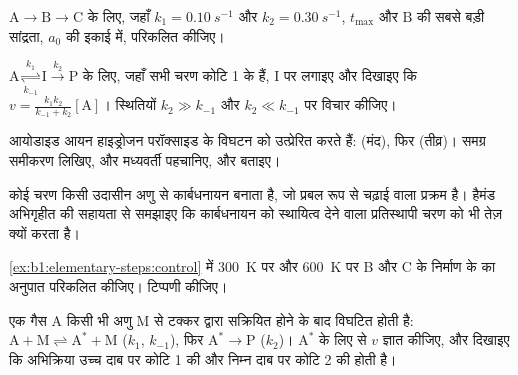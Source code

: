 \begin{exercise}[$\star\star$]\label{exo:b1:elementary-steps:5}
$\mathrm{A} \to \mathrm{B} \to \mathrm{C}$ के लिए, जहाँ $k_1 =
\qty{0.10}{s^{-1}}$ और $k_2 = \qty{0.30}{s^{-1}}$, $t_{\max}$ और
$\mathrm{B}$ की सबसे बड़ी सांद्रता, $a_0$ की इकाई में, परिकलित कीजिए।
\end{exercise}

\begin{exercise}[$\star\star$]\label{exo:b1:elementary-steps:6}
$\mathrm{A} \underset{k_{-1}}{\overset{k_1}{\rightleftharpoons}}
\mathrm{I} \xrightarrow{k_2} \mathrm{P}$ के लिए, जहाँ सभी चरण कोटि 1 के हैं,
$\mathrm{I}$ पर  लगाइए और दिखाइए कि $v =
\frac{k_1k_2}{k_{-1} + k_2}[\mathrm{A}]$। स्थितियों $k_2 \gg
k_{-1}$ और $k_2 \ll k_{-1}$ पर विचार कीजिए।
\end{exercise}

\begin{exercise}[$\star\star$]\label{exo:b1:elementary-steps:7}
आयोडाइड आयन हाइड्रोजन परॉक्साइड के विघटन को उत्प्रेरित करते हैं:
 (मंद), फिर 
(तीव्र)। समग्र समीकरण लिखिए,  और
मध्यवर्ती पहचानिए, और  बताइए।
\end{exercise}

\begin{exercise}[$\star\star$]\label{exo:b1:elementary-steps:8}
कोई चरण किसी उदासीन अणु से कार्बधनायन बनाता है, जो प्रबल रूप से चढ़ाई वाला
प्रक्रम है। हैमंड अभिगृहीत की सहायता से समझाइए कि कार्बधनायन को
स्थायित्व देने वाला प्रतिस्थापी चरण को भी तेज़ क्यों करता है।
\end{exercise}

\begin{exercise}[$\star\star$]\label{exo:b1:elementary-steps:9}
\cref{ex:b1:elementary-steps:control} में \qty{300}{K} पर और \qty{600}{K} पर
B और C के निर्माण के  का अनुपात परिकलित कीजिए।
टिप्पणी कीजिए।
\end{exercise}

\begin{exercise}[$\star\star\star$]\label{exo:b1:elementary-steps:10}
एक गैस $\mathrm{A}$ किसी भी
अणु $\mathrm{M}$ से टक्कर द्वारा सक्रियित होने के बाद विघटित होती है: $\mathrm{A} + \mathrm{M} \rightleftharpoons
\mathrm{A}^* + \mathrm{M}$ ($k_1$, $k_{-1}$), फिर $\mathrm{A}^* \to
\mathrm{P}$ ($k_2$)। $\mathrm{A}^*$ के लिए  से
$v$ ज्ञात कीजिए, और दिखाइए कि अभिक्रिया उच्च दाब पर कोटि 1 की
और निम्न दाब पर कोटि 2 की होती है।
\end{exercise}

